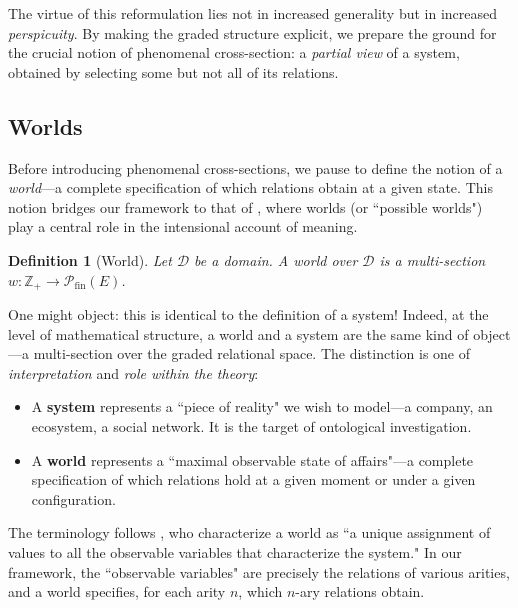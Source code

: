\documentclass[12pt,a4paper]{article}
\newtheorem{definition}{Definition}[section]
\newcommand{\domain}{\mathcal{D}}
\newcommand{\pfin}{\mathcal{P}_{\mathrm{fin}}}
\begin{document}
The virtue of this reformulation lies not in increased generality but in increased \emph{perspicuity}. By making the graded structure explicit, we prepare the ground for the crucial notion of phenomenal cross-section: a \emph{partial view} of a system, obtained by selecting some but not all of its relations.

\subsection{Worlds}

Before introducing phenomenal cross-sections, we pause to define the notion of a \emph{world}---a complete specification of which relations obtain at a given state. This notion bridges our framework to that of \citet{guarino2009}, where worlds (or ``possible worlds") play a central role in the intensional account of meaning.

\begin{definition}[World]
\label{def:world}
Let $\domain$ be a domain. A \emph{world} over $\domain$ is a multi-section $w : \mathbb{Z}_+ \to \pfin(E)$.
\end{definition}

One might object: this is identical to the definition of a system! Indeed, at the level of mathematical structure, a world and a system are the same kind of object---a multi-section over the graded relational space. The distinction is one of \emph{interpretation} and \emph{role within the theory}:

\begin{itemize}
    \item A \textbf{system} represents a ``piece of reality" we wish to model---a company, an ecosystem, a social network. It is the target of ontological investigation.
    \item A \textbf{world} represents a ``maximal observable state of affairs"---a complete specification of which relations hold at a given moment or under a given configuration.
\end{itemize}

The terminology follows \citet{guarino2009}, who characterize a world as ``a unique assignment of values to all the observable variables that characterize the system." In our framework, the ``observable variables" are precisely the relations of various arities, and a world specifies, for each arity $n$, which $n$-ary relations obtain.
\end{document}
